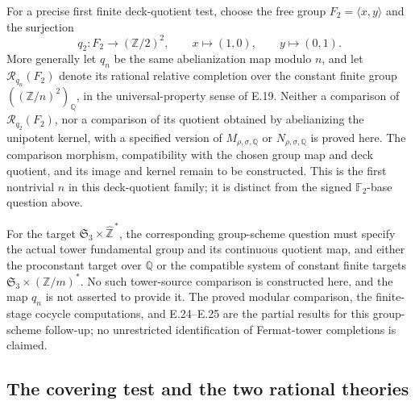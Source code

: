 For a precise first finite deck-quotient test, choose the free
group \(F_2=\langle x,y\rangle\) and the surjection
\[
 q_2:F_2\longrightarrow(\mathbb Z/2)^2,
 \qquad x\longmapsto(1,0),\qquad y\longmapsto(0,1).
\]
More generally let \(q_n\) be the same abelianization map
modulo \(n\), and let \(\mathcal R_{q_n}(F_2)\) denote its
rational relative completion over the constant finite group
\(((\mathbb Z/n)^2)_{\mathbb Q}\), in the universal-property
sense of E.19.  Neither a comparison of
\(\mathcal R_{q_2}(F_2)\), nor a comparison of its quotient
obtained by abelianizing the unipotent kernel, with a specified
version of \(M_{\rho,\sigma,\mathbb Q}\) or
\(N_{\rho,\sigma,\mathbb Q}\) is proved here.
The comparison morphism, compatibility with the chosen group
map and deck quotient, and its image and kernel remain to be
constructed.  This is the first nontrivial \(n\) in this
deck-quotient family; it is distinct from the signed
\(\mathbb F_2\)-base question above.

For the target \(\mathfrak S_3\times\widehat{\mathbb Z}^{\,*}\),
the corresponding group-scheme question must specify the
actual tower fundamental group and its continuous quotient
map, and either the proconstant target over \(\mathbb Q\)
or the compatible system of constant finite targets
\(\mathfrak S_3\times(\mathbb Z/m)^{*}\).
No such tower-source comparison is constructed here, and
the map \(q_n\) is not asserted to provide it.
The proved modular comparison, the finite-stage cocycle
computations, and E.24--E.25 are the partial results for this
group-scheme follow-up; no unrestricted identification of
Fermat-tower completions is claimed.

\subsection{The covering test and the two rational theories}

